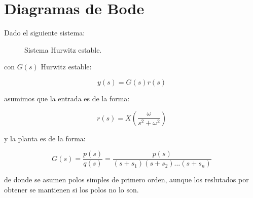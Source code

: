 
\chapter{Diagramas de Bode}

    Dado el siguiente sistema:

    \begin{figure}
        \centering
        \caption{\label{dia:bode1}Sistema Hurwitz estable.}
    \end{figure}

    con $G(s)$ Hurwitz estable:

    \begin{equation*}
        y(s) = G(s) r(s)
    \end{equation*}

    asumimos que la entrada es de la forma:

    \begin{equation*}
        r(s) = X \left( \frac{\omega}{s^2 + \omega^2} \right)
    \end{equation*}

    y la planta es de la forma:

    \begin{equation*}
        G(s) = \frac{p(s)}{q(s)} = \frac{p(s)}{(s + s_1) (s + s_2) \dots (s + s_n)}
    \end{equation*}

    de donde se asumen polos simples de primero orden, aunque los reslutados por obtener se mantienen si los polos no lo son.

